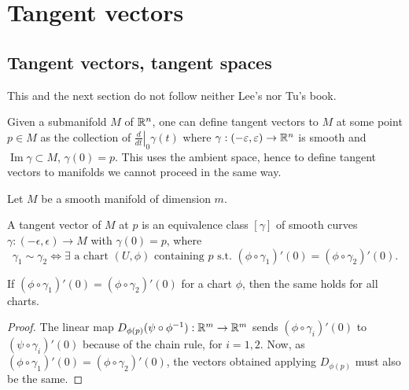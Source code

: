 \chapter{Tangent vectors}

\section{Tangent vectors, tangent spaces}

\begin{note}
    This and the next section do not follow neither Lee's nor Tu's book.
\end{note}

\begin{remark}
    Given a submanifold $M$ of $\mathbb{R}^n$, one can define tangent vectors to $M$ at some point $p \in M$ as the collection of
    $\left.\frac{d}{dt}\right|_0 \gamma(t)$  where  $\gamma: (-\varepsilon, \varepsilon) \to  \mathbb{R}^n$ is smooth and $\operatorname{Im} \gamma \subset M$, $\gamma(0) = p$.
This uses the ambient space, hence to define tangent vectors to manifolds we cannot proceed in the same way.
\end{remark}

 Let $M$ be a smooth manifold of dimension $m$.


\begin{definition}
  A tangent vector of $M$ at $p$ is an equivalence class $[\gamma]$ of smooth curves $\gamma: (-\epsilon, \epsilon) \to  M$ with $\gamma(0) = p$, where
    \[
        \gamma_1 \sim \gamma_2 \iff \exists \text{ a chart $(U,\phi)$ containing $p$ s.t.\ } (\phi  \circ  \gamma_1)'(0) = (\phi  \circ \gamma_2)'(0)
    .\] 
\end{definition}

\begin{lemma}
    \label{lem:1}
    If $(\phi  \circ  \gamma_1)'(0) = (\phi  \circ  \gamma_2)'(0)$ for a chart $\phi$, then the same holds for all charts.
\end{lemma}



\begin{proof}
The linear map $D_{\phi(p)}(\psi  \circ  \phi^{-1}): \mathbb{R}^m \to  \mathbb{R}^m$
sends $(\phi  \circ \gamma_i)'(0)$ to $(\psi  \circ  \gamma_i)'(0)$ because of the chain rule, for $i = 1, 2$.
Now, as $(\phi  \circ \gamma_1)'(0) = (\phi \circ \gamma_2)'(0)$, the vectors obtained  applying $D_{\phi(p)}$ must also be the same.
\end{proof}

